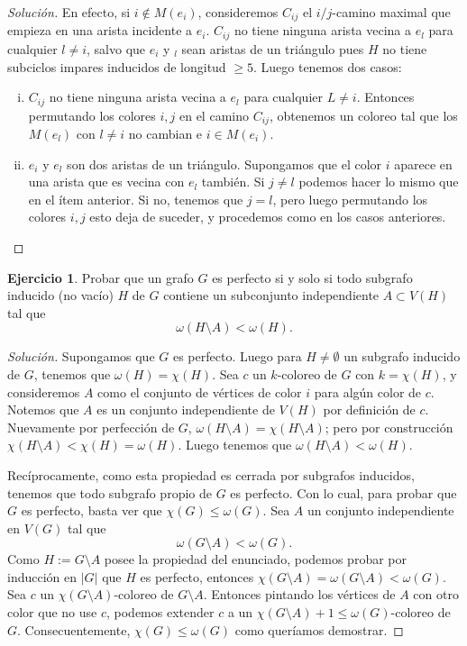 \documentclass[12pt]{report}
\theoremstyle{plain}
\theoremstyle{definition}
\newtheorem{exercise}[theorem]{Ejercicio}
\newenvironment{solution}{\begin{proof}[Solución]}{\end{proof}}
\newcommand{\abs}[1]{\left \vert #1 \right \vert}
\begin{document}
\begin{solution}
En efecto, si $i \not \in M(e_i)$, consideremos $C_{ij}$ el $i/j$-camino maximal que empieza en una arista incidente a $e_i$. $C_{ij}$ no tiene ninguna arista vecina a $e_l$ para cualquier $l \neq i$, salvo que $e_i$ y $_l$ sean aristas de un triángulo pues $H$ no tiene subciclos impares inducidos de longitud $\geq 5$. Luego tenemos dos casos:
\begin{enumerate}[(i)]
\item $C_{ij}$ no tiene ninguna arista vecina a $e_l$ para cualquier $L \neq i$. Entonces permutando los colores $i,j$ en el camino $C_{ij}$, obtenemos un coloreo tal que los $M(e_l)$ con $l \neq i$ no cambian e $i \in M(e_i)$.
\item $e_i$ y $e_l$ son dos aristas de un triángulo. Supongamos que el color $i$ aparece en una arista que es vecina con $e_l$ también. Si $j \neq l$ podemos hacer lo mismo que en el ítem anterior. Si no, tenemos que $j = l$, pero luego permutando los colores $i,j$ esto deja de suceder, y procedemos como en los casos anteriores.
\end{enumerate}
\end{solution}


\begin{exercise}
Probar que un grafo $G$ es perfecto si y solo si todo subgrafo inducido (no vacío) $H$ de $G$ contiene un subconjunto independiente $A \subset V(H)$ tal que
\[
    \omega (H \setminus A) < \omega (H).
\]
\end{exercise}
\begin{solution}
Supongamos que $G$ es perfecto. Luego para $H\neq \emptyset$ un subgrafo inducido de $G$, tenemos que $\omega (H) = \chi (H)$. Sea $c$ un $k$-coloreo de $G$ con $k = \chi (H)$, y consideremos $A$ como el conjunto de vértices de color $i$ para algún color de $c$. Notemos que $A$ es un conjunto independiente de $V(H)$ por definición de $c$. Nuevamente por perfección de $G$, $\omega (H \setminus A) = \chi (H \setminus A)$; pero por construcción $\chi (H \setminus A) < \chi (H) = \omega (H)$. Luego tenemos que $\omega (H \setminus A ) < \omega (H)$.

Recíprocamente, como esta propiedad es cerrada por subgrafos inducidos, tenemos que todo subgrafo propio de $G$ es perfecto. Con lo cual, para probar que $G$ es perfecto, basta ver que $\chi (G) \leq \omega (G)$. Sea $A$ un conjunto independiente en $V(G)$ tal que
\[
    \omega (G \setminus A )< \omega (G).
\]
Como $H := G \setminus A$ posee la propiedad del enunciado, podemos probar por inducción en $\abs G$ que $H$ es perfecto, entonces $\chi (G \setminus A) = \omega (G \setminus A) < \omega (G)$. Sea $c$ un $\chi (G \setminus A)$-coloreo de $G \setminus A$. Entonces pintando los vértices de $A$ con otro color que no use $c$, podemos extender $c$ a un $\chi (G \setminus A) + 1 \leq \omega (G)$-coloreo de $G$. Consecuentemente, $\chi (G) \leq \omega (G)$ como queríamos demostrar.
\end{solution}
\end{document}
